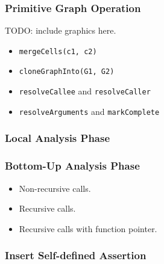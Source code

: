 \documentclass[aspectratio=1610, 13pt]{beamer}
\begin{document}
\begin{frame}\frametitle{Primitive Graph Operation}

TODO: include graphics here.
\begin{itemize}
\item \texttt{mergeCells(c1, c2)}

\item \texttt{cloneGraphInto(G1, G2)}

\item \texttt{resolveCallee} and \texttt{resolveCaller}

\item \texttt{resolveArguments} and \texttt{markComplete}
\end{itemize}

\end{frame}

\begin{frame}\frametitle{Local Analysis Phase}

\end{frame}

\begin{frame}\frametitle{Bottom-Up Analysis Phase}
\begin{itemize}
\item Non-recursive calls.
\item Recursive calls.
\item Recursive calls with function pointer.
\end{itemize}
\end{frame}


\begin{frame}\frametitle{Insert Self-defined Assertion}

\end{frame}

\begin{frame}\frametitle{}

\end{frame}
\end{document}
